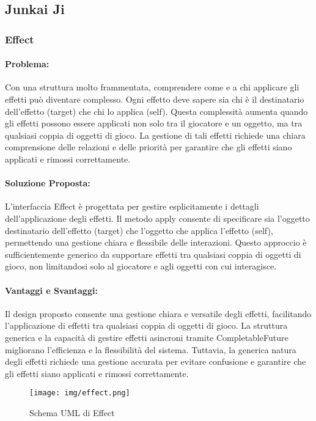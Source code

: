 \documentclass[a4paper,12pt]{report}
\begin{document}
	
	
	
	\subsection{Junkai Ji}
	
	\subsubsection{Effect}
	\paragraph{Problema:} Con una struttura molto frammentata, comprendere come e a chi applicare gli effetti può diventare complesso. Ogni effetto deve sapere sia chi è il destinatario dell’effetto (target) che chi lo applica (self). Questa complessità aumenta quando gli effetti possono essere applicati non solo tra il giocatore e un oggetto, ma tra qualsiasi coppia di oggetti di gioco. La gestione di tali effetti richiede una chiara comprensione delle relazioni e delle priorità per garantire che gli effetti siano applicati e rimossi correttamente.
	\paragraph{Soluzione Proposta:} L’interfaccia Effect è progettata per gestire esplicitamente i dettagli dell’applicazione degli effetti. Il metodo apply consente di specificare sia l’oggetto destinatario dell’effetto (target) che l’oggetto che applica l’effetto (self), permettendo una gestione chiara e flessibile delle interazioni. Questo approccio è sufficientemente generico da supportare effetti tra qualsiasi coppia di oggetti di gioco, non limitandosi solo al giocatore e agli oggetti con cui interagisce.
	\paragraph{Vantaggi e Svantaggi:}
	Il design proposto consente una gestione chiara e versatile degli effetti, facilitando l’applicazione di effetti tra qualsiasi coppia di oggetti di gioco. La struttura generica e la capacità di gestire effetti asincroni tramite CompletableFuture migliorano l’efficienza e la flessibilità del sistema. Tuttavia, la generica natura degli effetti richiede una gestione accurata per evitare confusione e garantire che gli effetti siano applicati e rimossi correttamente.
	
	\begin{figure}[H]
		\centering
		\texttt{[image: img/effect.png]}
		\caption{Schema UML di Effect}
		\label{img:effect}
	\end{figure}
	
\end{document}

